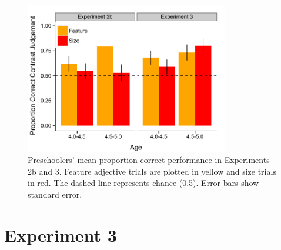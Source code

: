 \documentclass[10pt,letterpaper]{article}
\begin{document}


\begin{figure}[t] 
  \begin{center} 
    \includegraphics[width=3.5in]{figures/results_expt2b&3_n75.pdf} 
    \caption{\label{fig:kids2} Preschoolers' mean proportion correct performance in Experiments 2b and 3.  Feature adjective trials are plotted in yellow and size trials in red.
The dashed line represents chance (0.5). Error bars show standard error.}
  \end{center} 
\end{figure}

\section{Experiment 3} 
\end{document}
